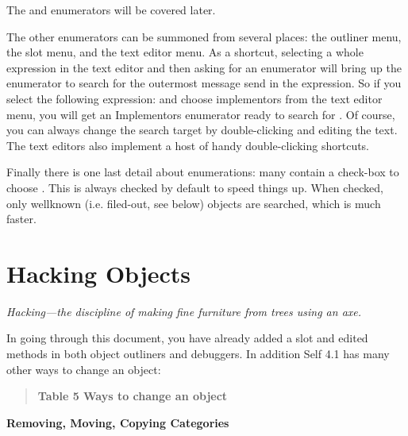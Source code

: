 \documentclass[letterpaper,10pt,english]{sphinxmanual}
\begin{document}
The  and  enumerators will be covered later.

The other enumerators can be summoned from several places: the outliner menu, the slot menu,
and the text editor menu. As a shortcut, selecting a whole expression in the text editor and then asking
for an enumerator will bring up the enumerator to search for the outermost message send in the
expression. So if you select the following expression:   
\code{{[}snort{]}}  \code{{[}sludge{]}} and choose implementors from the text editor menu, you will
get an Implementors enumerator ready to search for . Of
course, you can always change the search target by double-clicking and editing the text. The text
editors also implement a host of handy double-clicking shortcuts.

Finally there is one last detail about enumerations: many contain a check-box to choose . This is always checked by default to speed things up. When checked, only wellknown
(i.e. filed-out, see below) objects are searched, which is much faster.


\section{Hacking Objects}
\label{howtoprg:hacking-objects}
\emph{Hacking---the discipline of making fine furniture from trees using an axe.}

In going through this document, you have already added a slot and edited methods in both object
outliners and debuggers. In addition Self 4.1 has many other ways to change an object:
\begin{quote}

\textbf{Table 5 Ways to change an object}
\end{quote}

\textbf{Removing, Moving, Copying Categories}
\end{document}
